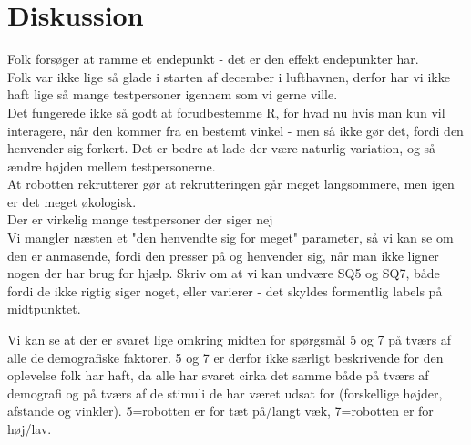 \chapter{Diskussion}
\label{TestAfSkalaDiskussion}
Folk forsøger at ramme et endepunkt - det er den effekt endepunkter har.\\
Folk var ikke lige så glade i starten af december i lufthavnen, derfor har vi ikke haft lige så mange testpersoner igennem som vi gerne ville.\\
Det fungerede ikke så godt at forudbestemme R, for hvad nu hvis man kun vil interagere, når den kommer fra en bestemt vinkel - men så ikke gør det, fordi den henvender sig forkert. Det er bedre at lade der være naturlig variation, og så ændre højden mellem testpersonerne.\\
At robotten rekrutterer gør at rekrutteringen går meget langsommere, men igen er det meget økologisk.\\
Der er virkelig mange testpersoner der siger nej\\
Vi mangler næsten et "den henvendte sig for meget" parameter, så vi kan se om den er anmasende, fordi den presser på og henvender sig, når man ikke ligner nogen der har brug for hjælp.\blankline
%
Skriv om at vi kan undvære SQ5 og SQ7, både fordi de ikke rigtig siger noget, eller varierer - det skyldes formentlig labels på midtpunktet. 

Vi kan se at der er svaret lige omkring midten for spørgsmål 5 og 7 på tværs af alle de demografiske faktorer. 5 og 7 er derfor ikke særligt beskrivende for den oplevelse folk har haft, da alle har svaret cirka det samme både på tværs af demografi og på tværs af de stimuli de har været udsat for (forskellige højder, afstande og vinkler). 5=robotten er for tæt på/langt væk, 7=robotten er for høj/lav.
